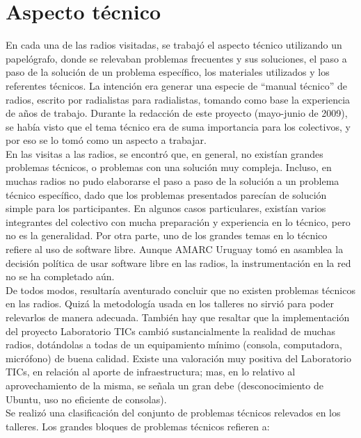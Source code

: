 \chapter{Aspecto técnico\label{tecnico}}

\indent En cada una de las radios visitadas, se trabajó el aspecto técnico utilizando un papelógrafo, donde se relevaban problemas frecuentes y sus soluciones, el paso a paso de la solución de un problema específico, los materiales utilizados y los referentes técnicos. La intención era generar una especie de “manual técnico” de radios, escrito por radialistas para radialistas, tomando como base la experiencia de años de trabajo. Durante la redacción de este proyecto (mayo-junio de 2009), se había visto que el tema técnico era de suma importancia para los colectivos, y por eso se lo tomó como un aspecto a trabajar.\\

En las visitas a las radios, se encontró que, en general, no existían grandes problemas técnicos, o problemas con una solución muy compleja. Incluso, en muchas radios no pudo elaborarse el paso a paso de la solución a un problema técnico específico, dado que los problemas presentados parecían de solución simple para los participantes. En algunos casos particulares, existían varios integrantes del colectivo con mucha preparación y experiencia en lo técnico, pero no es la generalidad. Por otra parte, uno de los grandes temas en lo técnico refiere al uso de software libre. Aunque AMARC Uruguay tomó en asamblea la decisión política de usar software libre en las radios, la instrumentación en la red no se ha completado aún.\\

De todos modos, resultaría aventurado concluir que no existen problemas técnicos en las radios. Quizá la metodología usada en los talleres no sirvió para poder relevarlos de manera adecuada. También hay que resaltar que la implementación del proyecto Laboratorio TICs cambió sustancialmente la realidad de muchas radios, dotándolas a todas de un equipamiento mínimo (consola, computadora, micrófono) de buena calidad. Existe una valoración muy positiva del Laboratorio TICs, en relación al aporte de infraestructura; mas, en lo relativo al aprovechamiento de la misma, se señala un gran debe (desconocimiento de Ubuntu, uso no eficiente de consolas).\\

Se realizó una clasificación del conjunto de problemas técnicos relevados en los talleres. Los grandes bloques de problemas técnicos refieren a:

